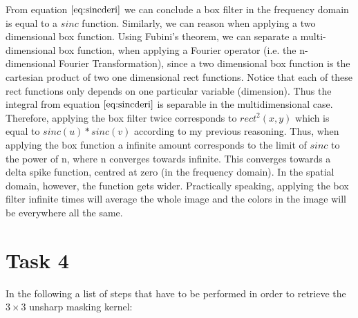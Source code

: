 \documentclass{paper}
\begin{document}
From equation $\ref{eq:sincderi}$ we can conclude a box filter in the frequency domain is equal to a $sinc$ function. Similarly, we can reason when applying a two dimensional box function. Using Fubini's theorem, we can separate a multi-dimensional box function, when applying a Fourier operator (i.e. the n-dimensional Fourier Transformation), since a two dimensional box function is the cartesian product of two one dimensional rect functions. Notice that each of these rect functions only depends on one particular variable (dimension). Thus the integral from equation $\ref{eq:sincderi}$ is separable in the multidimensional case. Therefore, applying the box filter twice corresponds to $rect^2(x,y)$ which is equal to $sinc(u)*sinc(v)$ according to my previous reasoning. Thus, when applying the box function a infinite amount corresponds to the limit of $sinc$ to the power of n, where n converges towards infinite. This converges towards a delta spike function, centred at zero (in the frequency domain). In the spatial domain, however, the function gets wider. Practically speaking, applying the box filter infinite times will average the whole image and  the colors in the image will be everywhere all the same.


\section*{Task 4}

In the following a list of steps that have to be performed in order to retrieve the $3 \times 3$ unsharp masking kernel:  
\end{document}
